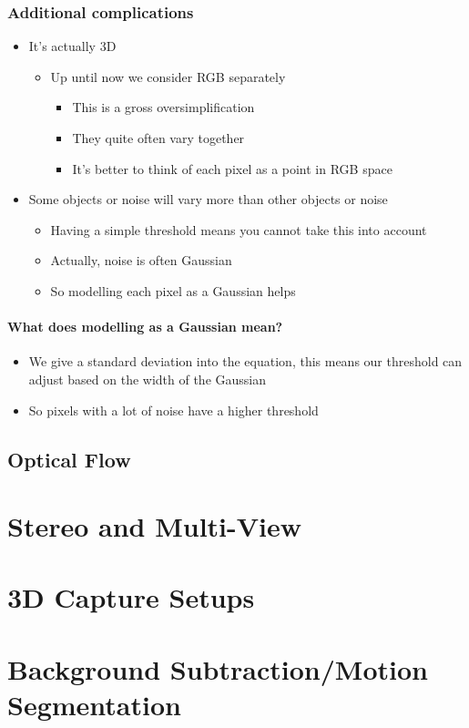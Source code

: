 \documentclass[a4paper]{article}
\begin{document}
\subsubsection{Additional complications}
\label{sec-4-1-4}
\begin{itemize}
\item It's actually 3D
\begin{itemize}
\item Up until now we consider RGB separately
\begin{itemize}
\item This is a gross oversimplification
\item They quite often vary together
\item It's better to think of each pixel as a point in RGB space
\end{itemize}
\end{itemize}
\item Some objects or noise will vary more than other objects or noise
\begin{itemize}
\item Having a simple threshold means you cannot take this into account
\item Actually, noise is often Gaussian
\item So modelling each pixel as a Gaussian helps
\end{itemize}
\end{itemize}

\paragraph{What does modelling as a Gaussian mean?}
\label{sec-4-1-4-1}
\begin{itemize}
\item We give a standard deviation into the equation, this means our threshold can adjust based on the width of the Gaussian
\item So pixels with a lot of noise have a higher threshold
\end{itemize}

\subsection{Optical Flow}
\label{sec-4-2}

\section{Stereo and Multi-View}
\label{sec-5}

\section{3D Capture Setups}
\label{sec-6}

\section{Background Subtraction/Motion Segmentation}
\label{sec-7}
\end{document}
